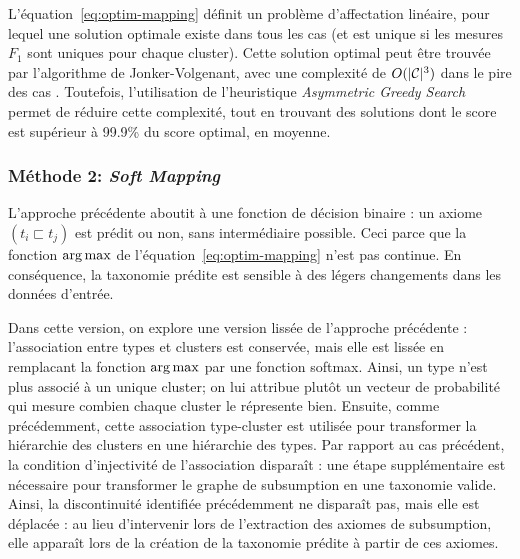 L'équation~\ref{eq:optim-mapping} définit un problème d'affectation linéaire, pour lequel une solution optimale existe dans tous les cas (et est unique si les mesures $F_1$ sont uniques pour chaque cluster).
Cette solution optimal peut être trouvée par l'algorithme de Jonker-Volgenant, avec une complexité de $O(|\mathcal{C}|^3)$ dans le pire des cas \cite{jonker1987shortest}. Toutefois, l'utilisation de l'heuristique \textit{Asymmetric Greedy Search} \cite{brown2017heuristic} permet de réduire cette complexité, tout en trouvant des solutions dont le score est supérieur à 99.9\% du score optimal, en moyenne.

\subsubsection{Méthode 2: \textit{Soft Mapping}}
\label{ssubsec:te-softmapping}

L'approche précédente aboutit à une fonction de décision binaire : un axiome $(t_i \sqsubset t_j)$ est prédit ou non, sans intermédiaire possible. Ceci parce que la fonction $\operatorname*{arg\,max}$ de l'équation~\ref{eq:optim-mapping} n'est pas continue. En conséquence, la taxonomie prédite est sensible à des légers changements dans les données d'entrée.

Dans cette version, on explore une version lissée de l'approche précédente : l'association entre types et clusters est conservée, mais elle est lissée en remplacant la fonction $\operatorname*{arg\,max}$ par une fonction softmax. Ainsi, un type n'est plus associé à un unique cluster; on lui attribue plutôt un vecteur de probabilité qui mesure combien chaque cluster le répresente bien. Ensuite, comme précédemment, cette association type-cluster est utilisée pour transformer la hiérarchie des clusters en une hiérarchie des types. Par rapport au cas précédent, la condition d'injectivité de l'association disparaît : une étape supplémentaire est nécessaire pour transformer le graphe de subsumption en une taxonomie valide. Ainsi, la discontinuité identifiée précédemment ne disparaît pas, mais elle est déplacée : au lieu d'intervenir lors de l'extraction des axiomes de subsumption, elle apparaît lors de la création de la taxonomie prédite à partir de ces axiomes. 


